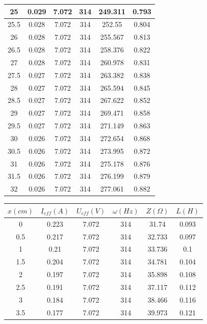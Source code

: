 \documentclass[10pt,a4paper]{article}
\begin{document}
\begin{flushleft}
\begin{itemize}
\begin{table}[H]
{\begin{subtable}[t]{.6\textwidth}
\begin{tabular}{|c|c|c|c|c|c|}
\hline
25 & 0.029 & 7.072 & 314 & 249.311 & 0.793 \\ 
\hline
25.5 & 0.028 & 7.072 & 314 & 252.55 & 0.804 \\ 
\hline
26 & 0.028 & 7.072 & 314 & 255.567 & 0.813 \\ 
\hline
26.5 & 0.028 & 7.072 & 314 & 258.376 & 0.822 \\ 
\hline
27 & 0.028 & 7.072 & 314 & 260.978 & 0.831 \\ 
\hline
27.5 & 0.027 & 7.072 & 314 & 263.382 & 0.838 \\ 
\hline
28 & 0.027 & 7.072 & 314 & 265.594 & 0.845 \\ 
\hline
28.5 & 0.027 & 7.072 & 314 & 267.622 & 0.852 \\ 
\hline
29 & 0.027 & 7.072 & 314 & 269.471 & 0.858 \\ 
\hline
29.5 & 0.027 & 7.072 & 314 & 271.149 & 0.863 \\ 
\hline
30 & 0.026 & 7.072 & 314 & 272.654 & 0.868 \\ 
\hline
30.5 & 0.026 & 7.072 & 314 & 273.995 & 0.872 \\ 
\hline
31 & 0.026 & 7.072 & 314 & 275.178 & 0.876 \\ 
\hline
31.5 & 0.026 & 7.072 & 314 & 276.199 & 0.879 \\ 
\hline
32 & 0.026 & 7.072 & 314 & 277.061 & 0.882 \\ 
\hline
\end{tabular}
\normalsize
\label{tab:messerg_spul1}
\end{subtable}%
%
\begin{subtable}[t]{.6\textwidth}
\centering
{}
\tiny
\begin{tabular}{|c|c|c|c|c|c|}
\hline
$x (cm)$ & $I_{eff} (A)$ & $U_{eff} (V)$ & $\omega (Hz)$ & $Z (\Omega)$ & $L (H)$ \\
\hline
0 & 0.223 & 7.072 & 314 & 31.74 & 0.093 \\ 
\hline
0.5 & 0.217 & 7.072 & 314 & 32.733 & 0.097 \\ 
\hline
1 & 0.21 & 7.072 & 314 & 33.736 & 0.1 \\ 
\hline
1.5 & 0.204 & 7.072 & 314 & 34.781 & 0.104 \\ 
\hline
2 & 0.197 & 7.072 & 314 & 35.898 & 0.108 \\ 
\hline
2.5 & 0.191 & 7.072 & 314 & 37.117 & 0.112 \\ 
\hline
3 & 0.184 & 7.072 & 314 & 38.466 & 0.116 \\ 
\hline
3.5 & 0.177 & 7.072 & 314 & 39.973 & 0.121 \\ 

\end{tabular}
\end{subtable}}
\end{table}
\end{itemize}
\end{flushleft}
\end{document}
